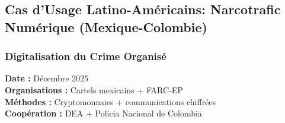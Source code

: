 \subsection{Cas d'Usage Latino-Américains: Narcotrafic Numérique (Mexique-Colombie)}

\subsubsection{Digitalisation du Crime Organisé}

\textbf{Date :} Décembre 2025 \\
\textbf{Organisations :} Cartels mexicains + FARC-EP \\
\textbf{Méthodes :} Cryptomonnaies + communications chiffrées \\
\textbf{Coopération :} DEA + Policia Nacional de Colombia

